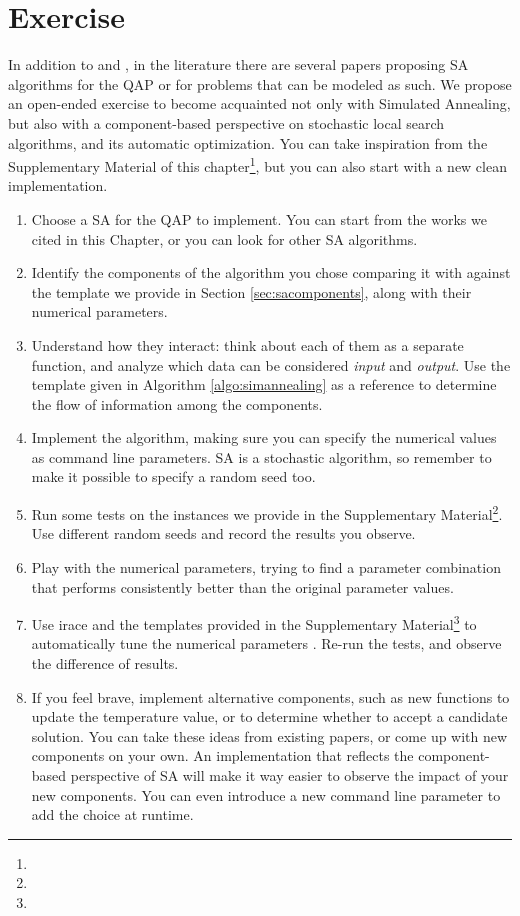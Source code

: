 \section{Exercise}\label{sec:exercise}
In addition to \brsa and \qsa, in the literature there are several papers
proposing SA algorithms for the QAP or for problems that can be modeled
as such. 
We propose an open-ended exercise to become acquainted not only with 
Simulated Annealing, but also with a component-based perspective
on stochastic local search algorithms, and its automatic optimization.
You can take inspiration from the Supplementary Material of this chapter\footnote{\supplementurlsa}, but you can also start with a new clean implementation.

\begin{enumerate}
    \item Choose a SA for the QAP to implement. You can start from the works we
    cited in this Chapter, or you can look for other SA algorithms.
    \item Identify the components of the algorithm you chose
    comparing it with against the template we provide in Section
    \ref{sec:sacomponents}, along with their numerical parameters.
    \item Understand how they interact: think about each of them as a separate
    function, and analyze which data can be considered \textit{input}
    and \textit{output}.
    Use the template given in Algorithm \ref{algo:simannealing} as a  
    reference to determine the flow of information among the components.
    \item Implement the algorithm, making sure you can specify the 
    numerical values as command line parameters. SA is
    a stochastic algorithm, so remember to
    make it possible to specify a random seed too.
    \item Run some tests on the instances we provide in the Supplementary
    Material\footnote{\supplementurlsa}. Use different random seeds and record the results
    you observe.
    \item Play with the numerical parameters, trying to find
    a parameter combination that performs consistently better than
    the original parameter values.
    \item Use irace and the templates
    provided in the Supplementary Material\footnote{\supplementurlsa} to automatically tune
    the numerical parameters \cite{LopDubPerStuBir2016irace}. 
    Re-run the tests, and observe the difference of results.
    \item If you feel brave, implement alternative components, such as
    new functions to update the temperature value, or to determine 
    whether to accept a candidate solution. You can take these ideas
    from existing papers, or come up with new components on your own.
    An implementation that reflects the component-based perspective
    of SA will make it way easier to observe the impact of your new
    components. You can even introduce a new command line parameter
    to add the choice at runtime.
\end{enumerate}

